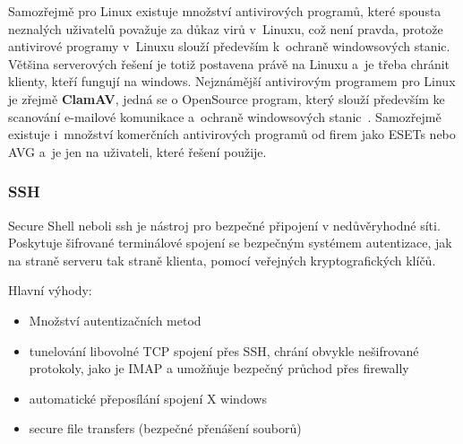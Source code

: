\documentclass[a4paper,12pt]{article}
\renewcommand{\b}[1]{\textbf{#1}} %
\begin{document}
Samozřejmě pro Linux existuje množství antivirových programů, které spousta neznalých uživatelů považuje za důkaz virů v~Linuxu, což není pravda, protože antivirové programy v~Linuxu slouží především k~ochraně windowsových stanic. Většina serverových řešení je totiž postavena právě na Linuxu a~je třeba chránit klienty, kteří fungují na windows. Nejznámější antivirovým programem pro Linux je zřejmě \b{ClamAV}, jedná se o OpenSource program, který slouží především ke scanování e-mailové komunikace a~ochraně windowsových stanic~\cite{ClamAV}. Samozřejmě existuje i~množství komerčních antivirových programů od firem jako ESETs nebo AVG a~je jen na uživateli, které řešení použije.

\subsubsection{SSH}\label{sec:SSH}

Secure Shell neboli ssh je nástroj pro bezpečné připojení v nedůvěryhodné síti. Poskytuje šifrované terminálové spojení se bezpečným systémem autentizace, jak na straně serveru tak straně klienta, pomocí veřejných kryptografických klíčů.

Hlavní výhody:
\begin{itemize}
 \item Množství autentizačních metod
 \item tunelování libovolné TCP spojení přes SSH, chrání obvykle nešifrované protokoly, jako je IMAP a umožňuje bezpečný průchod přes firewally
 \item automatické přeposílání spojení X windows
 \item secure file transfers (bezpečné přenášení souborů)
\end{itemize}
\end{document}
